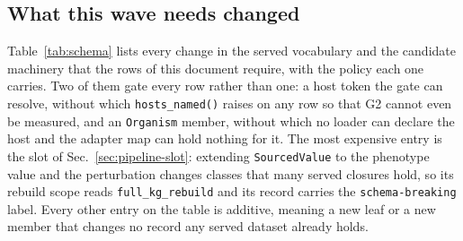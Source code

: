 \subsection{What this wave needs changed}\label{sec:pipeline-schema}

Table~\ref{tab:schema} lists every change in the served vocabulary and the candidate machinery
that the rows of this document require, with the policy each one carries. Two of them gate
every row rather than one: a host token the gate can resolve, without which
\texttt{hosts\_named()} raises on any  row so that G2 cannot even be
measured, and an \texttt{Organism} member, without which no loader can declare the host and the
adapter map can hold nothing for it. The most expensive entry is the slot of
Sec.~\ref{sec:pipeline-slot}: extending \texttt{SourcedValue} to the phenotype value and the
perturbation changes classes that many served closures hold, so its rebuild scope reads
\texttt{full\_kg\_rebuild} and its record carries the \texttt{schema-breaking} label. Every
other entry on the table is additive, meaning a new leaf or a new member that changes no record
any served dataset already holds.


